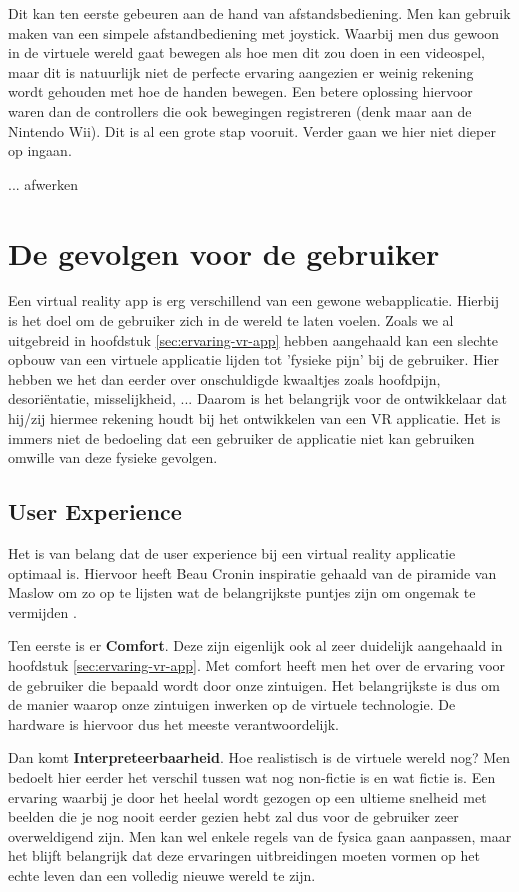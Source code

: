 Dit kan ten eerste gebeuren aan de hand van afstandsbediening. Men kan gebruik maken van een simpele afstandbediening met joystick. Waarbij men dus gewoon in de virtuele wereld gaat bewegen als hoe men dit zou doen in een videospel, maar dit is natuurlijk niet de perfecte ervaring aangezien er weinig rekening wordt gehouden met hoe de handen bewegen. Een betere oplossing hiervoor waren dan de controllers die ook bewegingen registreren (denk maar aan de Nintendo Wii). Dit is al een grote stap vooruit. Verder gaan we hier niet dieper op ingaan.

... afwerken

\section{De gevolgen voor de gebruiker}
\label{sec:gevolgen-vr}
Een virtual reality app is erg verschillend van een gewone webapplicatie. Hierbij is het doel om de gebruiker zich in de wereld te laten voelen. Zoals we al uitgebreid in hoofdstuk \ref{sec:ervaring-vr-app} hebben aangehaald kan een slechte opbouw van een virtuele applicatie lijden tot 'fysieke pijn' bij de gebruiker. Hier hebben we het dan eerder over onschuldigde kwaaltjes zoals hoofdpijn, desoriëntatie, misselijkheid, ... Daarom is het belangrijk voor de ontwikkelaar dat hij/zij hiermee rekening houdt bij het ontwikkelen van een VR applicatie. Het is immers niet de bedoeling dat een gebruiker de applicatie niet kan gebruiken omwille van deze fysieke gevolgen.

\subsection{User Experience}
\label{subsec:user-experience}
Het is van belang dat de user experience bij een virtual reality applicatie optimaal is. Hiervoor heeft Beau Cronin inspiratie gehaald van de piramide van Maslow om zo op te lijsten wat de belangrijkste puntjes zijn om ongemak te vermijden \autocite{Cronin2015}.

Ten eerste is er \textbf{Comfort}. Deze zijn eigenlijk ook al zeer duidelijk aangehaald in hoofdstuk \ref{sec:ervaring-vr-app}. Met comfort heeft men het over de ervaring voor de gebruiker die bepaald wordt door onze zintuigen. Het belangrijkste is dus om de manier waarop onze zintuigen inwerken op de virtuele technologie. De hardware is hiervoor dus het meeste verantwoordelijk.

Dan komt \textbf{Interpreteerbaarheid}. Hoe realistisch is de virtuele wereld nog? Men bedoelt hier eerder het verschil tussen wat nog non-fictie is en wat fictie is. Een ervaring waarbij je door het heelal wordt gezogen op een ultieme snelheid met beelden die je nog nooit eerder gezien hebt zal dus voor de gebruiker zeer overweldigend zijn. Men kan wel enkele regels van de fysica gaan aanpassen, maar het blijft belangrijk dat deze ervaringen uitbreidingen moeten vormen op het echte leven dan een volledig nieuwe wereld te zijn.

